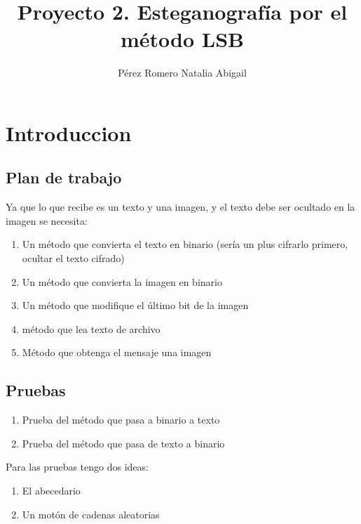 \documentclass{article}
\title{Proyecto 2. Esteganografía por el método LSB}
\author{Pérez Romero Natalia Abigail}
\begin{document}
\maketitle

\section{Introduccion}

\subsection{Plan de trabajo}

Ya que lo que recibe es un texto y una imagen, y el texto debe ser ocultado en la imagen se necesita:

\begin{enumerate}
    \item Un método que convierta el texto en binario (sería un plus cifrarlo primero, ocultar el texto cifrado)
    \item Un método que convierta la imagen en binario
    \item Un método que modifique el último bit
    de la imagen
    \item método que lea texto de archivo
    \item Método que obtenga el mensaje una imagen
\end{enumerate}

\subsection{Pruebas}
\begin{enumerate}
    \item Prueba del método que pasa a binario a texto
    \item Prueba del método que pasa de texto a binario
\end{enumerate}

Para las pruebas tengo dos ideas:
\begin{enumerate}
	\item El abecedario
	\item Un motón de cadenas aleatorias
\end{enumerate}
\end{document}
